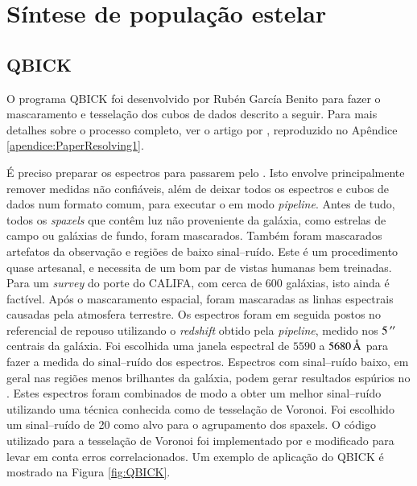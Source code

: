 \section{Síntese de população estelar}
\label{sec:ifs:sintese}

\subsection{QBICK}
\label{sec:ifs:qbick}

O programa QBICK foi desenvolvido por Rubén García Benito para fazer o
mascaramento e tesselação dos cubos de dados descrito a seguir. Para mais
detalhes sobre o processo completo, ver o artigo por \citet{CidFernandes2013},
reproduzido no Apêndice \ref{apendice:PaperResolving1}.

É preciso preparar os espectros para passarem pelo \starlight. Isto envolve
principalmente remover medidas não confiáveis, além de deixar todos os espectros
e cubos de dados num formato comum, para executar o \starlight em modo {\em
pipeline}. Antes de tudo, todos os {\em spaxels} que contêm luz não proveniente
da galáxia, como estrelas de campo ou galáxias de fundo, foram mascarados.
Também foram mascarados artefatos da observação e regiões de baixo sinal--ruído.
Este é um procedimento quase artesanal, e necessita de um bom par de vistas
humanas bem treinadas. Para um {\em survey} do porte do CALIFA, com cerca de 600
galáxias, isto ainda é factível. Após o mascaramento espacial, foram mascaradas
as linhas espectrais causadas pela atmosfera terrestre. Os espectros foram em
seguida postos no referencial de repouso utilizando o {\em redshift} obtido pela
{\em pipeline}, medido nos $5\,^{\prime\prime}$ centrais da galáxia. Foi escolhida uma
janela espectral de $5590$ a $5680\,\text{\normalfont\AA}$ para fazer a medida do
sinal--ruído dos espectros. Espectros com sinal--ruído baixo, em geral nas
regiões menos brilhantes da galáxia, podem gerar resultados espúrios no
\starlight. Estes espectros foram combinados de modo a obter um melhor
sinal--ruído utilizando uma técnica conhecida como de tesselação de Voronoi. Foi
escolhido um sinal--ruído de 20 como alvo para o agrupamento dos spaxels. O
código utilizado para a tesselação de Voronoi foi implementado por
\citet{Cappellari2003} e modificado para levar em conta erros correlacionados.
Um exemplo de aplicação do QBICK é mostrado na Figura \ref{fig:QBICK}.

